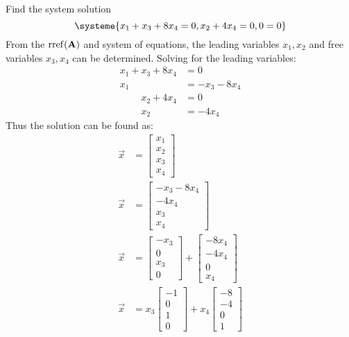 \documentclass{article}
\DeclareMathOperator{\rref}{rref}
\begin{document}
Find the system solution
\begin{equation*}
	\systeme{
		x_1 + x_3 + 8x_4 = 0,
		x_2 + 4x_4 = 0,
		0 = 0
	}
\end{equation*}
From the $ \rref(\matr{A}) $ and system of equations, the leading variables  $ x_1, x_2 $ and free variables $ x_3, x_4 $ can be determined. Solving for the leading variables:
\begin{align*}
	x_1 + x_3 + 8x_4 & = 0 \\
	x_1 & = -x_3 - 8x_4
\end{align*}
\begin{align*}
	x_2 + 4x_4 & = 0 \\
	x_2 & = -4x_4
\end{align*}
Thus the solution can be found as:
\begin{align*}
	\vec{x} & =
		\begin{bmatrix}
			x_1 \\
			x_2 \\
			x_3 \\
			x_4
		\end{bmatrix} \\
	\vec{x} & =
		\begin{bmatrix}
			-x_3 - 8x_4 \\
			-4x_4 \\
			x_3 \\
			x_4
		\end{bmatrix} \\
	\vec{x} & =
		\begin{bmatrix}
			-x_3 \\
			0 \\
			x_3 \\
			0
		\end{bmatrix}
		+ \begin{bmatrix}
			-8x_4 \\
			-4x_4 \\
			0 \\
			x_4
		\end{bmatrix} \\
	\vec{x} & =
		x_3 \begin{bmatrix}
			-1 \\
			0 \\
			1 \\
			0
		\end{bmatrix}
		+ x_4 \begin{bmatrix}
			-8 \\
			-4 \\
			0 \\
			1
		\end{bmatrix}
\end{align*}
\end{document}
